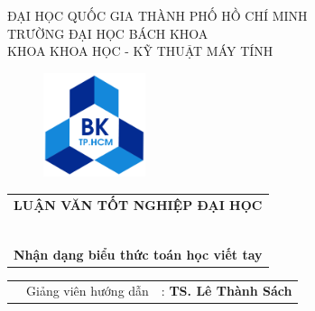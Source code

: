 \documentclass[a4paper,12pt]{article}
\begin{document}
	\begin{titlepage}
		
		\begin{center}
			ĐẠI HỌC QUỐC GIA THÀNH PHỐ HỒ CHÍ MINH \\
			TRƯỜNG ĐẠI HỌC BÁCH KHOA\\
			KHOA KHOA HỌC - KỸ THUẬT MÁY TÍNH\\
			
		\end{center}
		\vspace{1cm}
		
		\begin{figure}[h!]
			\begin{center}
				\includegraphics[width=3cm]{Images/hcmut.png}
			\end{center}
		\end{figure}
		\vspace{1cm}
		
		\begin{center}
			\begin{tabular}{c}
				\multicolumn{1}{c}{\textbf{{LUẬN VĂN TỐT NGHIỆP ĐẠI HỌC}}}\\
				~~\\
				\hline
				\\
				\multicolumn{1}{c}{\textbf{{\Large
							Nhận dạng biểu thức toán học viết tay
				}}}\\
				
			\end{tabular}
		\end{center}
		
		\vspace{1cm}
		
		\begin{table}[h]
			\begin{tabular}{rrl}
				\vspace{0.5cm}
				\hspace{1.5 cm} & Giảng viên hướng dẫn & : \bf{TS. Lê Thành Sách}\\
				

\end{tabular}
\end{table}
\end{titlepage}
\end{document}
